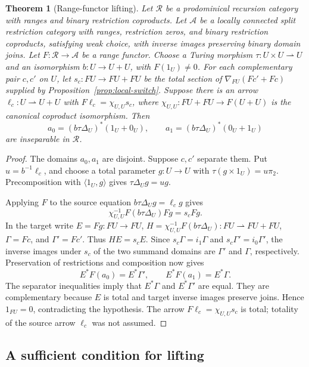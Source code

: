 \documentclass[11pt]{article}
\newtheorem{theorem}{Theorem}[section]
\begin{document}
\begin{theorem}[Range-functor lifting]\label{thm:local-lifting}
Let $\mathscr R$ be a prodominical recursion category with ranges and
binary restriction coproducts. Let $\mathcal A$ be a locally connected
split restriction category with ranges, restriction zeros, and binary
restriction coproducts, satisfying weak choice, with inverse images
preserving binary domain joins. Let
$F:\mathscr R\to\mathcal A$ be a range functor.
Choose a Turing morphism $\tau:U\times U\rightharpoonup U$ and
an isomorphism $b:U\to U+U$, with $F(1_U)\ne0$.
For each complementary pair $c,c'$ on $U$, let
$s_c:FU\to FU+FU$ be the total section of $\nabla_{FU}(Fc'+Fc)$ supplied by
Proposition~\ref{prop:local-switch}. Suppose there is an arrow
$\ell_c:U\rightharpoonup U+U$ with
$F\ell_c=\chi_{U,U}s_c$, where
$\chi_{U,U}:FU+FU\to F(U+U)$ is the canonical coproduct isomorphism.
Then
\[
 a_0=(b\tau\Delta_U)^*(1_U+0_U),\qquad
 a_1=(b\tau\Delta_U)^*(0_U+1_U)
\]
are inseparable in $\mathscr R$.
\end{theorem}
\begin{proof}
The domains $a_0,a_1$ are disjoint. Suppose $c,c'$ separate them.
Put $u=b^{-1}\ell_c$, and choose a total parameter $g:U\to U$ with
$\tau(g\times1_U)=u\pi_2$. Precomposition with $\langle1_U,g\rangle$
gives $\tau\Delta_Ug=ug$.

Applying $F$ to the source equation
$b\tau\Delta_Ug=\ell_cg$ gives
\[
 \chi_{U,U}^{-1}F(b\tau\Delta_U)Fg=s_cFg.
\]
In the target write $E=Fg:FU\to FU$,
$H=\chi_{U,U}^{-1}F(b\tau\Delta_U):FU\rightharpoonup FU+FU$,
$\Gamma=Fc$, and $\Gamma'=Fc'$. Thus $HE=s_cE$.
Since $s_c\Gamma=i_1\Gamma$ and $s_c\Gamma'=i_0\Gamma'$,
the inverse images under $s_c$ of the two summand domains are
$\Gamma'$ and $\Gamma$,
respectively. Preservation of restrictions and composition now gives
\[
 E^*F(a_0)=E^*\Gamma',\qquad E^*F(a_1)=E^*\Gamma.
\]
The separator inequalities imply that $E^*\Gamma$ and $E^*\Gamma'$
are equal. They are complementary because $E$ is total and target
inverse images preserve joins. Hence $1_{FU}=0$, contradicting the
hypothesis. The arrow $F\ell_c=\chi_{U,U}s_c$ is total; totality of
the source arrow $\ell_c$ was not assumed.
\end{proof}

\subsection{A sufficient condition for lifting}
\end{document}
